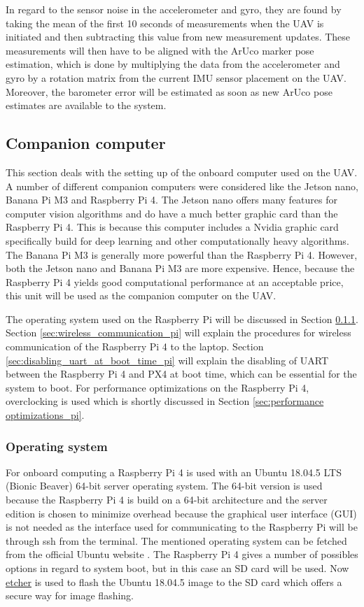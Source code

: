 \documentclass[../Head/report.tex]{subfiles}
\begin{document}
In regard to the sensor noise in the accelerometer and gyro, they are found by taking the mean of the first 10 seconds of measurements when the UAV is initiated and then subtracting this value from new measurement updates. These measurements will then have to be aligned with the ArUco marker pose estimation, which is done by multiplying the data from the accelerometer and gyro by a rotation matrix from the current IMU sensor placement on the UAV. Moreover, the barometer error will be estimated as soon as new ArUco pose estimates are available to the system.  

\subsection{Companion computer}
\label{sec:companion_computer}

This section deals with the setting up of the onboard computer used on the UAV. A number of different companion computers were considered like the Jetson nano, Banana Pi M3 and Raspberry Pi 4. The Jetson nano offers many features for computer vision algorithms and do have a much better graphic card than the Raspberry Pi 4. This is because this computer includes a Nvidia graphic card specifically build for deep learning and other computationally heavy algorithms. The Banana Pi M3 is generally more powerful than the Raspberry Pi 4. However, both the Jetson nano and Banana Pi M3 are more expensive. Hence, because the Raspberry Pi 4 yields good computational performance at an acceptable price, this unit will be used as the companion computer on the UAV. 

The operating system used on the Raspberry Pi will be discussed in Section \ref{sec:operating_system_pi}. Section \ref{sec:wireless_communication_pi} will explain the procedures for wireless communication of the Raspberry Pi 4 to the laptop. Section \ref{sec:disabling_uart_at_boot_time_pi} will explain the disabling of UART between the Raspberry Pi 4 and PX4 at boot time, which can be essential for the system to boot. For performance optimizations on the Raspberry Pi 4, overclocking is used which is shortly discussed in Section \ref{sec:performance optimizations_pi}. 

\subsubsection{Operating system}
\label{sec:operating_system_pi}

For onboard computing a Raspberry Pi 4 is used with an Ubuntu 18.04.5 LTS (Bionic Beaver) 64-bit server operating system. The 64-bit version is used because the Raspberry Pi 4 is build on a 64-bit architecture and the server edition is chosen to minimize overhead because the graphical user interface (GUI) is not needed as the interface used for communicating to the Raspberry Pi will be through ssh from the terminal. The mentioned operating system can be fetched from the official Ubuntu website \cite{ubuntuImage}. The Raspberry Pi 4 gives a number of possibles options in regard to system boot, but in this case an SD card will be used. Now  \href{https://www.balena.io/etcher/}{etcher} is used to flash the Ubuntu 18.04.5 image to the SD card which offers a secure way for image flashing. 
\end{document}
